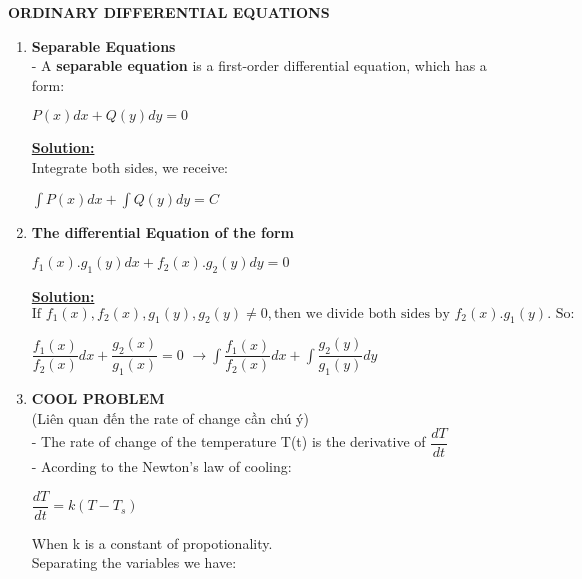 \documentclass[10pt]{article}
\begin{document}
\begin{center}
\textbf{ORDINARY DIFFERENTIAL EQUATIONS}
\end{center}
\begin{enumerate}
	\item \textbf{Separable Equations}\\
	- A \textbf{separable equation} is a first-order differential equation, which has a form:
	\begin{mybox}
	\begin{center}
	$P(x)dx + Q(y)dy = 0$
	\end{center}
	\end{mybox}
	\textbf{\underline{Solution:}}\\
	Integrate both sides, we receive:
	\begin{center}
	$\displaystyle \int P(x)dx +\int Q(y)dy = C$
	\end{center}
	\item \textbf{The differential Equation of the form}
	\begin{mybox}
	\begin{center}
	$f_1(x).g_1(y)dx + f_2(x).g_2(y)dy = 0$
	\end{center}
	\end{mybox}
	\textbf{\underline{Solution:}}\\
	\begin{equation}
	\mbox{If } f_1(x),f_2(x),g_1(y),g_2(y) \not = 0, \mbox{then we divide both sides by } f_2(x).g_1(y). \mbox{ So:}
	\end{equation}
	\begin{center}
	$\dfrac{f_1(x)}{f_2(x)}dx + \dfrac{g_2(x)}{g_1(x)} = 0$
	$\rightarrow{\displaystyle \int \dfrac{f_1(x)}{f_2(x)}dx + \int \dfrac{g_2(y)}{g_1(y)}dy}$
	\end{center}
	\item \textbf{COOL PROBLEM}\\
	(Liên quan đến the rate of change cần chú ý)\\
	- The rate of  change of the temperature T(t) is the derivative of $\dfrac{dT}{dt}$\\
	- Acording to the Newton's law of cooling:
	\begin{mybox}
	\begin{center}
	$\dfrac{dT}{dt} = k(T-T_s)$
	\end{center}
	\end{mybox}
	When k is a constant of propotionality.\\
	Separating the variables we have:
	\begin{center}

\end{center}
\end{enumerate}
\end{document}
